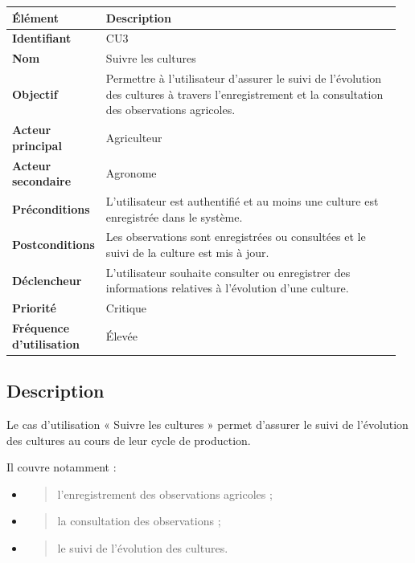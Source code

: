 \begin{longtable}{@{}p{0.18\linewidth}p{0.78\linewidth}@{}}
\toprule
\rowcolors{2}{gray!10}{white}
\textbf{Élément} & \textbf{Description} \\
\midrule
\endhead
\textbf{Identifiant} & CU3 \\
\textbf{Nom} & Suivre les cultures \\
\textbf{Objectif} & Permettre à l'utilisateur d'assurer le suivi de
l'évolution des cultures à travers l'enregistrement et la consultation
des observations agricoles. \\
\textbf{Acteur principal} & Agriculteur \\
\textbf{Acteur secondaire} & Agronome \\
\textbf{Préconditions} & L'utilisateur est authentifié et au moins une
culture est enregistrée dans le système. \\
\textbf{Postconditions} & Les observations sont enregistrées ou
consultées et le suivi de la culture est mis à jour. \\
\textbf{Déclencheur} & L'utilisateur souhaite consulter ou enregistrer
des informations relatives à l'évolution d'une culture. \\
\textbf{Priorité} & Critique \\
\textbf{Fréquence d'utilisation} & Élevée \\
\bottomrule
\end{longtable}

\hypertarget{description-1}{%
\subsection{Description}\label{description-1}}

Le cas d'utilisation « Suivre les cultures » permet d'assurer le suivi
de l'évolution des cultures au cours de leur cycle de production.

Il couvre notamment :

\begin{itemize}
\item
  \begin{quote}
  l'enregistrement des observations agricoles ;
  \end{quote}
\item
  \begin{quote}
  la consultation des observations ;
  \end{quote}
\item
  \begin{quote}
  le suivi de l'évolution des cultures.
  \end{quote}
\end{itemize}

